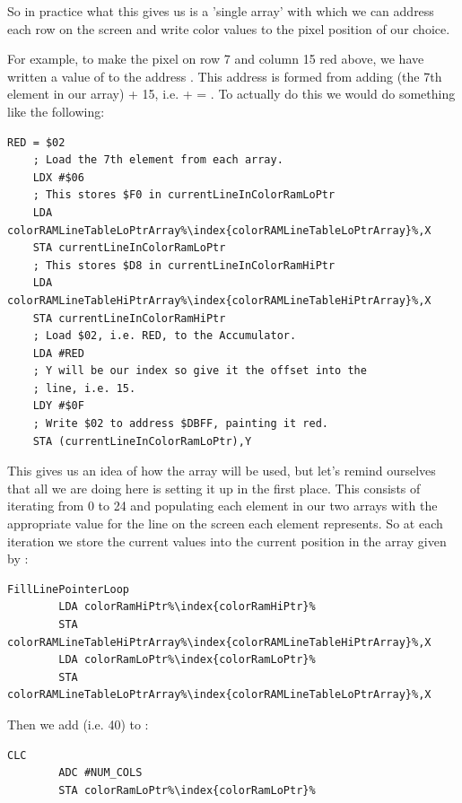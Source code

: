 So in practice what this gives us is a 'single array' with which we can address each row on the screen and write color values
to the pixel position of our choice.



For example, to make the pixel on row 7 and column 15 red above, we have written a value of  to the address . This 
address is
formed from adding  (the 7th element in our array) + 15, i.e.  +  = . 
To actually do this we would do something like the following:
 
\begin{lstlisting}[basicstyle=\ttfamily\scriptsize,escapechar=\%]
    RED = $02
    ; Load the 7th element from each array.
    LDX #$06
    ; This stores $F0 in currentLineInColorRamLoPtr
    LDA colorRAMLineTableLoPtrArray%\index{colorRAMLineTableLoPtrArray}%,X
    STA currentLineInColorRamLoPtr
    ; This stores $D8 in currentLineInColorRamHiPtr
    LDA colorRAMLineTableHiPtrArray%\index{colorRAMLineTableHiPtrArray}%,X
    STA currentLineInColorRamHiPtr
    ; Load $02, i.e. RED, to the Accumulator. 
    LDA #RED
    ; Y will be our index so give it the offset into the
    ; line, i.e. 15. 
    LDY #$0F
    ; Write $02 to address $DBFF, painting it red.
    STA (currentLineInColorRamLoPtr),Y
\end{lstlisting}

This gives us an idea of how the array will be used, but let's remind ourselves that all we are doing here is setting
it up in the first place. This consists of iterating from 0 to 24 and populating each element in our two arrays with
the appropriate value for the line on the screen each element represents. So at each iteration we store
the current values into the current position in the array given by :

\begin{lstlisting}[escapechar=\%]
FillLinePointerLoop
        LDA colorRamHiPtr%\index{colorRamHiPtr}%
        STA colorRAMLineTableHiPtrArray%\index{colorRAMLineTableHiPtrArray}%,X
        LDA colorRamLoPtr%\index{colorRamLoPtr}%
        STA colorRAMLineTableLoPtrArray%\index{colorRAMLineTableLoPtrArray}%,X
\end{lstlisting}

Then we add   (i.e. 40) to : 

\begin{lstlisting}[escapechar=\%]
        CLC 
        ADC #NUM_COLS
        STA colorRamLoPtr%\index{colorRamLoPtr}%
\end{lstlisting}

